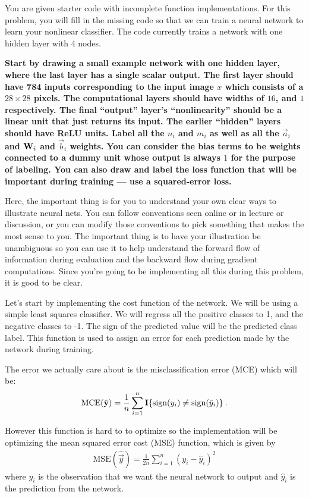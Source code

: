 \documentclass[preview]{standalone}
\begin{document}
You are given starter code with incomplete function implementations.  For this problem, you will fill in the missing code so that we can train a neural network to learn your nonlinear classifier. The code currently trains a network with one hidden layer with 4 nodes.

\begin{Parts}
\Part
{\bf Start by drawing a small example network with one hidden layer, where the last layer has a single scalar output. The first layer should have  784 inputs corresponding to the input image $x$ which consists of a $28 \times 28$ pixels. The computational layers should have widths of $16$, and $1$ respectively. The final ``output'' layer's ``nonlinearity'' should be a linear unit that just returns its input. The earlier ``hidden'' layers should have ReLU units. Label all the $n_i$ and $m_i$ as well as all the $\vec a_i$ and $\mathbf{W}_i$ and $\vec b_i$ weights. You can consider the bias terms to be weights connected to a dummy unit whose output is always $1$ for the purpose of labeling. You can also draw and label the loss function that will be important during training --- use a squared-error loss.}

Here, the important thing is for you to understand your own clear ways to illustrate neural nets. You can follow conventions seen online or in lecture or discussion, or you can modify those conventions to pick something that makes the most sense to you. The important thing is to have your illustration be unambiguous so you can use it to help understand the forward flow of information during evaluation and the backward flow during gradient computations. Since you're going to be implementing all this during this problem, it is good to be clear.



\Part
Let's start by implementing the cost function of the network.  We will be using a simple least squares classifier. We will regress all the positive classes to 1, and the negative classes to -1. The sign of the predicted value will be the predicted class label.
This function is used to assign an error for each prediction made by the network during training.

The error we actually care about is the  misclassification error (MCE) which will be:
\begin{align*}
    \text{MCE}(\hat{\boldsymbol{\mathbf{y}}})=\frac{1}{n}\sum_{i=1}^n \mathbf{I}\{\operatorname*{sign}(y_i) \neq \operatorname*{sign}(\hat{y}_i)\} \:.
\end{align*}

However this function is hard to to optimize so the implementation will be optimizing the mean squared error cost (MSE) function, which is given by
\begin{align*}
\text{MSE}(\hat{\vec{y}})=\frac{1}{2n}\sum_{i=1}^n( y_i - \hat{y}_i)^2
\end{align*}
where $y_i$ is the observation that we want the neural network to output and $\hat{y}_i$ is the prediction from the network.




\end{Parts}
\end{document}
